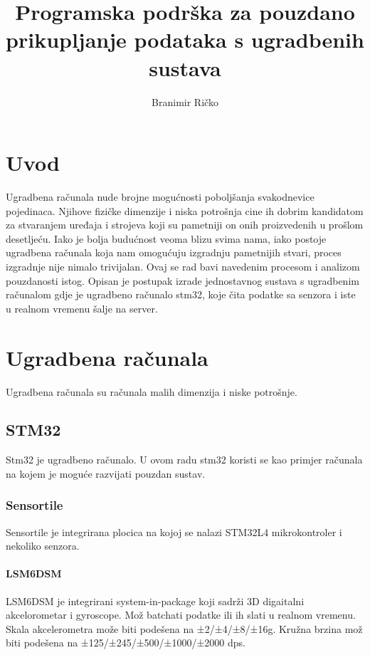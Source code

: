 \documentclass[times, utf8, diplomski]{fer}
\begin{document}

\title{Programska podrška za pouzdano prikupljanje podataka s ugradbenih sustava}

\author{Branimir Ričko}

\maketitle


\tableofcontents

\chapter{Uvod}
Ugradbena računala nude brojne mogućnosti poboljšanja svakodnevice pojedinaca. Njihove fizičke dimenzije i niska potrošnja cine ih dobrim kandidatom za stvaranjem uređaja i strojeva koji su pametniji on onih proizvedenih u prošlom desetljeću. Iako je bolja budućnost veoma blizu svima nama, iako postoje ugradbena računala koja nam omogućuju izgradnju pametnijih stvari, proces izgradnje nije nimalo trivijalan. Ovaj se rad bavi navedenim procesom i analizom pouzdanosti istog. Opisan je postupak izrade jednostavnog sustava s ugradbenim računalom gdje je ugradbeno računalo stm32, koje čita podatke sa senzora i iste u realnom vremenu \v{s}alje na server.

\chapter{Ugradbena računala}
Ugradbena računala su računala malih dimenzija i niske potro\v{s}nje. 

\section{STM32}
Stm32 je ugradbeno računalo. U ovom radu stm32 koristi se kao primjer računala na kojem je moguće razvijati pouzdan sustav.

\subsection{Sensortile}
Sensortile je integrirana plocica na kojoj se nalazi STM32L4 mikrokontroler i nekoliko senzora.

\subsubsection{LSM6DSM}
LSM6DSM je integrirani system-in-package koji sadr\v{z}i 3D digaitalni akcelorometar i gyroscope. Mo\v{z} batchati podatke ili ih slati u realnom
vremenu. Skala akcelerometra mo\v{z}e biti pode\v{s}ena na ±2/±4/±8/±16g. Kru\v{z}na brzina mo\v{z} biti pode\v{s}ena na
±125/±245/±500/±1000/±2000 dps.
\end{document}
